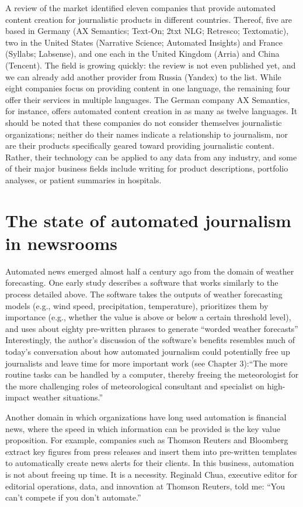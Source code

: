 \documentclass[notoc, symmetric, nobib, nols]{towcenter-guideto-book}
\begin{document}
A review of the market identified eleven companies that provide automated content creation for journalistic products in different countries.\autocite{doerr15} Thereof, five are based in Germany (AX Semantics; Text-On; 2txt NLG; Retresco; Textomatic), two in the United States (Narrative Science; Automated Insights) and France (Syllabs; Labsense), and one each in the United Kingdom (Arria) and China (Tencent). The field is growing quickly: the review is not even published yet, and we can already add another provider from Russia (Yandex) to the list. While eight companies focus on providing content in one language, the remaining four offer their services in multiple languages. The German company AX Semantics, for instance, offers automated content creation in as many as twelve languages. It should be noted that these companies do not consider themselves journalistic organizations; neither do their names indicate a relationship to journalism, nor are their products specifically geared toward providing journalistic content. Rather, their technology can be applied to any data from any industry, and some of their major business fields include writing for product descriptions, portfolio analyses, or patient summaries in hospitals. 

\section{The state of automated journalism in newsrooms}

Automated news emerged almost half a century ago from the domain of weather forecasting. One early study describes a software that works similarly to the process detailed above. The software takes the outputs of weather forecasting models (e.g., wind speed, precipitation, temperature), prioritizes them by importance (e.g., whether the value is above or below a certain threshold level), and uses about eighty pre-written phrases to generate ``worded weather forecasts'' Interestingly, the author's discussion of the software's benefits resembles much of today's conversation about how automated journalism could potentially free up journalists and leave time for more important work (see Chapter 3):``The more routine tasks can be handled by a computer, thereby freeing the meteorologist for the more challenging roles of meteorological consultant and specialist on high-impact weather situations.''\autocite{glahn70}

Another domain in which organizations have long used automation is financial news, where the speed in which information can be provided is the key value proposition. For example, companies such as Thomson Reuters and Bloomberg extract key figures from press releases and insert them into pre-written templates to automatically create news alerts for their clients. In this business, automation is not about freeing up time. It is a necessity. Reginald Chua, executive editor for editorial operations, data, and innovation at Thomson Reuters, told me: ``You can't compete if you don't automate.''
\end{document}
